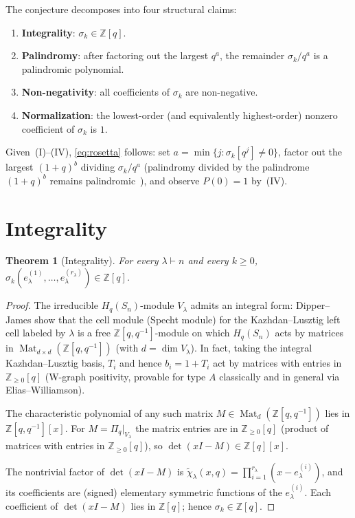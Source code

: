 \documentclass[11pt]{article}
\newtheorem{theorem}{Theorem}
\theoremstyle{definition}
\newcommand{\Pq}{\Pi_q}
\newcommand{\Hq}{H_q(S_n)}
\newcommand{\Z}{\mathbb{Z}}
\begin{document}
The conjecture decomposes into four structural claims:
\begin{enumerate}
\item[(I)]  \textbf{Integrality}: $\sigma_k\in\Z[q]$.
\item[(II)] \textbf{Palindromy}: after factoring out the largest $q^a$,
  the remainder $\sigma_k/q^a$ is a palindromic polynomial.
\item[(III)] \textbf{Non-negativity}: all coefficients of $\sigma_k$
  are non-negative.
\item[(IV)] \textbf{Normalization}: the lowest-order (and equivalently
  highest-order) nonzero coefficient of $\sigma_k$ is $1$.
\end{enumerate}
Given~(I)--(IV), \eqref{eq:rosetta} follows: set $a=\min\{j:\sigma_k[q^j]
\ne 0\}$, factor out the largest $(1+q)^b$ dividing $\sigma_k/q^a$
(palindromy divided by the palindrome $(1+q)^b$ remains
palindromic~\cite[standard]{stanley}), and observe $P(0)=1$ by~(IV).

\section{Integrality}

\begin{theorem}[Integrality]\label{thm:integrality}
For every $\lambda\vdash n$ and every $k\ge 0$,
$\sigma_k(e_\lambda^{(1)},\ldots,e_\lambda^{(r_\lambda)})\in\Z[q]$.
\end{theorem}

\begin{proof}
The irreducible $\Hq$-module $V_\lambda$ admits an integral form:
Dipper--James show that the cell module (Specht module) for the
Kazhdan--Lusztig left cell labeled by $\lambda$ is a free
$\Z[q,q^{-1}]$-module on which $\Hq$ acts by matrices in
$\operatorname{Mat}_{d\times d}(\Z[q,q^{-1}])$ (with $d=\dim
V_\lambda$). In fact, taking the integral Kazhdan--Lusztig basis,
$T_i$ and hence $b_i=1+T_i$ act by matrices with entries in
$\Z_{\ge 0}[q]$ (W-graph positivity, provable for type $A$ classically
and in general via Elias--Williamson).

The characteristic polynomial of any such matrix
$M\in\operatorname{Mat}_{d}(\Z[q,q^{-1}])$ lies in $\Z[q,q^{-1}][x]$.
For $M=\Pq|_{V_\lambda}$ the matrix entries are in $\Z_{\ge 0}[q]$
(product of matrices with entries in $\Z_{\ge 0}[q]$), so
$\det(xI-M)\in\Z[q][x]$.

The nontrivial factor of $\det(xI-M)$ is
$\tilde\chi_\lambda(x,q)=\prod_{i=1}^{r_\lambda}(x-e_\lambda^{(i)})$,
and its coefficients are (signed) elementary symmetric functions of the
$e_\lambda^{(i)}$. Each coefficient of $\det(xI-M)$ lies in $\Z[q]$;
hence $\sigma_k\in\Z[q]$.
\end{proof}
\end{document}
